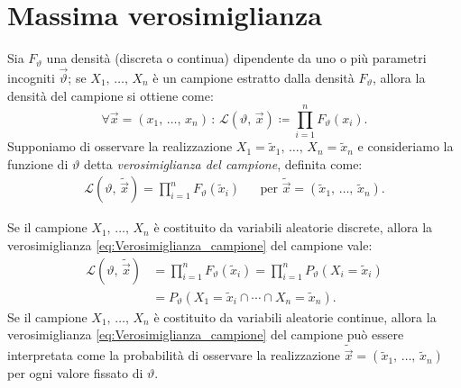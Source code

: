     \section{Massima verosimiglianza}
        \begin{defn}[Verosimiglianza]
            Sia $F_\vartheta$ una densità (discreta o continua) dipendente da uno o più parametri incogniti 
            $\vec{\vartheta}$; se $X_1,\, \ldots,\, X_{n}$ è un campione estratto dalla densità $F_\vartheta$, 
            allora la densità del campione si ottiene come: \[
                \forall \vec{x} = (x_1,\, \ldots,\, x_{n}) \,:\, 
                \mathcal{L}(\vartheta,\, \vec{x}) \coloneqq \prod_{i=1}^{n} F_{\vartheta}(x_i)
            .\] Supponiamo di osservare la realizzazione $X_1 = \tilde{x}_1,\, \ldots,\, X_n = \tilde{x}_n$ e 
            consideriamo la funzione di $\vartheta$ detta \emph{verosimiglianza del campione}, definita come:
            \begin{align}\label{eq:Verosimiglianza_campione}
                \mathcal{L}(\vartheta,\, \tilde{\vec{x}}) = \prod_{i=1}^{n} F_\vartheta(\tilde{x}_i)
                & & \text{per } \tilde{\vec{x}} = (\tilde{x}_1,\, \ldots,\, \tilde{x}_n)
            .\end{align}
        \end{defn}
        \begin{obsv}
            Se il campione $X_1,\, \ldots,\, X_{n}$ è costituito da variabili aleatorie discrete, allora 
            la verosimiglianza \eqref{eq:Verosimiglianza_campione} del campione vale:
            \begin{align*}
                \mathcal{L}(\vartheta,\, \tilde{\vec{x}}) &= \prod_{i=1}^{n} F_\vartheta(\tilde{x}_i) =
                \prod_{i=1}^{n} P_\vartheta(X_i = \tilde{x}_i) \\
                &= P_\vartheta(X_1=\tilde{x}_i \cap \dotsm \cap X_n=\tilde{x}_n)
            .\end{align*}
            Se il campione $X_1,\, \ldots,\, X_{n}$ è costituito da variabili aleatorie continue, allora 
            la verosimiglianza \eqref{eq:Verosimiglianza_campione} del campione può essere interpretata 
            come la probabilità di osservare la realizzazione 
            $\tilde{\vec{x}} = (\tilde{x}_1,\, \ldots,\, \tilde{x}_{n})$ per ogni valore fissato di $\vartheta$.
        \end{obsv}
